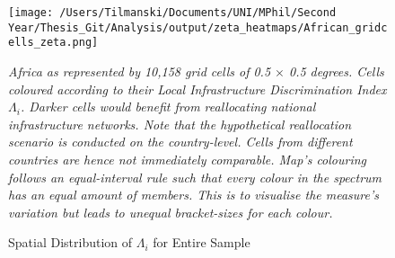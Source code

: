 \documentclass[11pt, oneside]{article}   	%
\newcommand{\mysubcaption}[1]{
\justify
\begin{spacing}{0.7}
\textit{\footnotesize #1}
\end{spacing}}
\begin{document}
\begin{figure}
\centering
\caption{Spatial Distribution of $\Lambda_{i}$ for Entire Sample}
\texttt{[image: /Users/Tilmanski/Documents/UNI/MPhil/Second Year/Thesis\_Git/Analysis/output/zeta\_heatmaps/African\_gridcells\_zeta.png]}

\label{fig:all_gridcells_by_zeta}
\mysubcaption{Africa as represented by 10,158 grid cells of 0.5 $\times$ 0.5 degrees. Cells coloured according to their Local Infrastructure Discrimination Index $\Lambda_{i}$. Darker cells would benefit from reallocating national infrastructure networks. Note that the hypothetical reallocation scenario is conducted on the country-level. Cells from different countries are hence not immediately comparable. Map's colouring follows an equal-interval rule such that every colour in the spectrum has an equal amount of members. This is to visualise the measure's variation but leads to unequal bracket-sizes for each colour.}
\end{figure}
\end{document}
